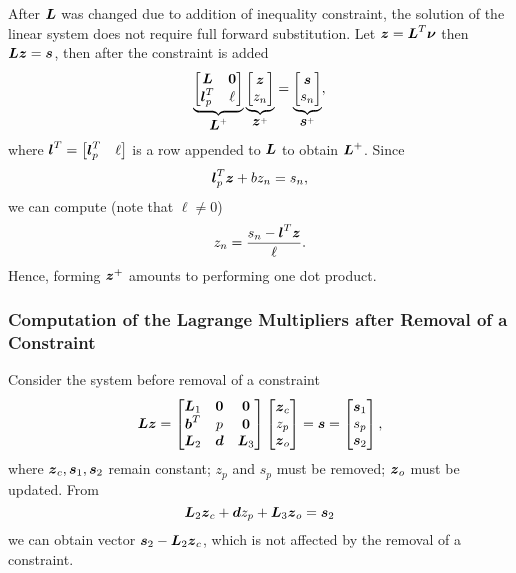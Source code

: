 After $\mbox{\boldmath $L$}$ was changed due to addition of inequality constraint, the solution of the linear 
system does not require full forward substitution. Let $\mbox{\boldmath $z$} = \mbox{\boldmath $L$}^T\mbox{\boldmath $\nu$}$ then 
$\mbox{\boldmath $L$}\mbox{\boldmath $z$} = \mbox{\boldmath $s$}$, then after the constraint is added
$$
  \underbrace{\begin{bmatrix} \mbox{\boldmath $L$} & \mbox{\boldmath $0$} \\ \mbox{\boldmath $l$}^T_p & \ell \end{bmatrix}}_{\mbox{\boldmath $L$}^{+}}
  \underbrace{\begin{bmatrix} \mbox{\boldmath $z$} \\ z_n \end{bmatrix}}_{\mbox{\boldmath $z$}^{+}} = 
  \underbrace{\begin{bmatrix} \mbox{\boldmath $s$} \\ s_n \end{bmatrix}}_{\mbox{\boldmath $s$}^{+}},
$$
%
where $\mbox{\boldmath $l$}^T = \begin{bmatrix} \mbox{\boldmath $l$}^T_p & \ell \end{bmatrix}$ is a row 
appended to $\mbox{\boldmath $L$}$ to obtain $\mbox{\boldmath $L$}^{+}$. Since
$$
\mbox{\boldmath $l$}^T_p\mbox{\boldmath $z$} + bz_n = s_n,
$$
we can compute (note that $\ell\neq0$)
$$
z_n = \frac{s_n - \mbox{\boldmath $l$}^T\mbox{\boldmath $z$}}{\ell}.
$$
Hence, forming $\mbox{\boldmath $z$}^{+}$ amounts to performing one dot product. 


\subsubsection{Computation of the Lagrange Multipliers after Removal of a Constraint}
Consider the system before removal of a constraint
$$
\mbox{\boldmath $L$}\mbox{\boldmath $z$} = 
\begin{bmatrix}
    \mbox{\boldmath $L$}_1 & \mbox{\boldmath $0$}     & \mbox{\boldmath $0$}\\
    \mbox{\boldmath $b$}^T & p           & \mbox{\boldmath $0$}\\
    \mbox{\boldmath $L$}_2 & \mbox{\boldmath $d$}     & \mbox{\boldmath $L$}_3\\
\end{bmatrix}
\begin{bmatrix}
    \mbox{\boldmath $z$}_c\\
    z_p\\
    \mbox{\boldmath $z$}_o\\
\end{bmatrix}
 = 
\mbox{\boldmath $s$} =
\begin{bmatrix}
    \mbox{\boldmath $s$}_1\\
    s_p\\
    \mbox{\boldmath $s$}_2\\
\end{bmatrix},
$$
where $\mbox{\boldmath $z$}_c, \mbox{\boldmath $s$}_1, \mbox{\boldmath $s$}_2$ remain constant; $z_p$ and $s_p$ must be removed;
$\mbox{\boldmath $z$}_o$ must be updated. From
$$
\mbox{\boldmath $L$}_2\mbox{\boldmath $z$}_c + \mbox{\boldmath $d$}z_p + \mbox{\boldmath $L$}_3 \mbox{\boldmath $z$}_o = \mbox{\boldmath $s$}_2
$$
we can obtain vector $\mbox{\boldmath $s$}_2 - \mbox{\boldmath $L$}_2 \mbox{\boldmath $z$}_c$, which is not affected by the removal
of a constraint.

